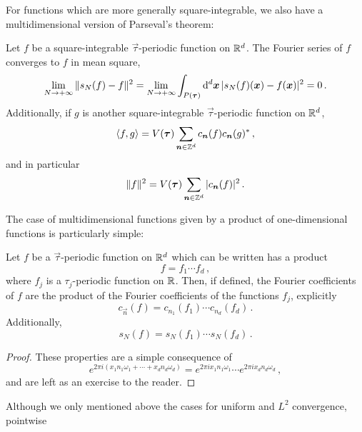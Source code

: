 For functions which are more generally square-integrable, we also have a multidimensional
version of Parseval's theorem:
\begin{theorem}[Parseval]
  Let $f$ be a square-integrable $\vec{\tau}$-periodic function on $\mathbb{R}^d$. The Fourier
  series of $f$ converges to $f$ in mean square, \ie
  \begin{equation}
    \lim_{N\to+\infty}\|s_N(f)-f\|^2=\lim_{N\to+\infty}
    \int_{P(\bm{\tau})}\mathrm{d}^d\bm{x}\,|s_N(f)(\bm{x})-f(\bm{x})|^2=0\,.
  \end{equation}
  Additionally, if $g$ is another square-integrable $\vec{\tau}$-periodic function on
  $\mathbb{R}^d$,
  \begin{equation}
    \braket{f,g}=V(\bm{\tau})\sum_{\bm{n}\in\mathbb{Z}^d}c_{\bm{n}}(f)c_{\bm{n}}(g)^*\,,
  \end{equation}
  and in particular
  \begin{equation}
    \|f\|^2=V(\bm{\tau})\sum_{\bm{n}\in\mathbb{Z}^d}|c_{\bm{n}}(f)|^2\,.
  \end{equation}
\end{theorem}
The case of multidimensional functions given by a product of one-dimensional functions is
particularly simple:
\begin{proposition}
  Let $f$ be a $\vec{\tau}$-periodic function on $\mathbb{R}^d$ which can be written has a product
  \begin{equation}
    f=f_1\cdots f_d\,,
  \end{equation}
  where $f_j$ is a $\tau_j$-periodic function on $\mathbb{R}$. Then, if defined, the Fourier
  coefficients of $f$ are the product of the Fourier coefficients of the functions $f_j$,
  explicitly
  \begin{equation}
    c_{\vec{n}}(f)=c_{n_1}(f_1)\cdots c_{n_d}(f_d)\,.
  \end{equation}
  Additionally,
  \begin{equation}
    s_N(f)=s_N(f_1)\cdots s_N(f_d)\,.
  \end{equation}
\end{proposition}
\begin{proof}
  These properties are a simple consequence of
  \begin{equation}
    e^{2\pi i(x_1n_1\omega_1+\cdots+x_dn_d\omega_d)}=e^{2\pi ix_1n_1\omega_1}\cdots
    e^{2\pi ix_dn_d\omega_d}\,,
  \end{equation}
  and are left as an exercise to the reader.
\end{proof}
Although we only mentioned above the cases for uniform and $L^2$ convergence, pointwise
